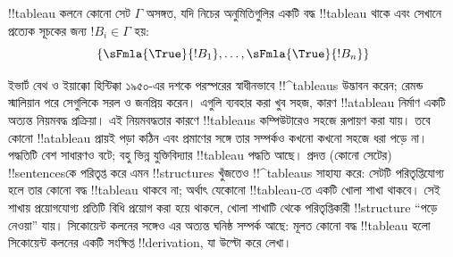 \documentclass[../../../include/open-logic-section]{subfiles}
\begin{document}
!!{tableau} কলনে কোনো সেট $\Gamma$ অসঙ্গত, যদি নিচের অনুমিতিগুলির
একটি বদ্ধ !!{tableau} থাকে এবং সেখানে প্রত্যেক সূচকের জন্য
$!B_i \in \Gamma$ হয়:
\[
\{\sFmla{\True}{!B_1}, \dots, \sFmla{\True}{!B_n}\}
\]


ইভার্ট বেথ ও ইয়াক্কো হিন্টিক্কা ১৯৫০-এর দশকে পরস্পরের স্বাধীনভাবে
!!^{tableau}s উদ্ভাবন করেন; রেমন্ড স্মালিয়ান পরে সেগুলিকে সরল ও
জনপ্রিয় করেন। এগুলি ব্যবহার করা খুব সহজ, কারণ !!a{tableau} নির্মাণ
একটি অত্যন্ত নিয়মবদ্ধ প্রক্রিয়া। এই নিয়মবদ্ধতার কারণে
!!{tableau}s কম্পিউটারেও সহজে রূপায়ণ করা যায়। তবে কোনো !!a{tableau}
প্রায়ই পড়া কঠিন এবং প্রমাণের সঙ্গে তার সম্পর্কও কখনো কখনো সহজে ধরা
পড়ে না। পদ্ধতিটি বেশ সাধারণও বটে; বহু ভিন্ন যুক্তিবিদ্যার
!!{tableau} পদ্ধতি আছে। প্রদত্ত (কোনো সেটের) !!{sentence}sকে
পরিতৃপ্ত করে এমন !!{structure}s খুঁজতেও !!^{tableau}s সাহায্য করে:
সেটটি পরিতৃপ্তিযোগ্য হলে তার কোনো বদ্ধ !!{tableau} থাকবে না; অর্থাৎ
যেকোনো !!{tableau}-তে একটি খোলা শাখা থাকবে। সেই শাখায় প্রয়োগযোগ্য
প্রতিটি বিধি প্রয়োগ করা হয়ে থাকলে, খোলা শাখাটি থেকে পরিতৃপ্তিকারী
!!{structure} “পড়ে নেওয়া” যায়। সিকোয়েন্ট কলনের সঙ্গেও এর অত্যন্ত
ঘনিষ্ঠ সম্পর্ক আছে: মূলত কোনো বদ্ধ !!{tableau} হলো সিকোয়েন্ট কলনের
একটি সংক্ষিপ্ত !!{derivation}, যা উল্টো করে লেখা।
\end{document}
